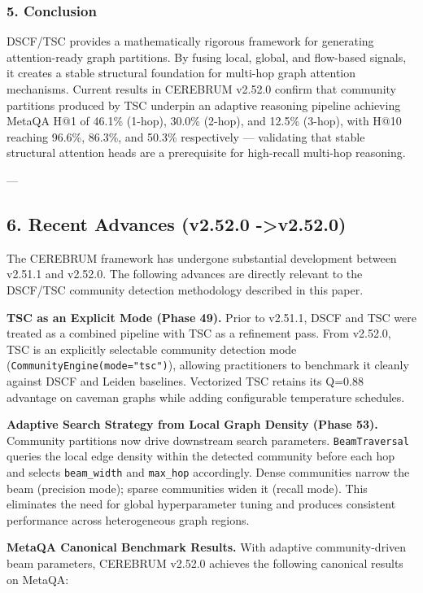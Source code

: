 \subsubsection{5. Conclusion}
DSCF/TSC provides a mathe\-matically rigorous framework for generating attention-ready graph partitions. By fusing local, global, and flow-based signals, it creates a stable structural foundation for multi-hop graph attention mechanisms. Current results in CEREBRUM v2.52.0 confirm that community partitions produced by TSC underpin an adaptive reasoning pipeline achieving MetaQA H@1 of 46.1\% (1-hop), 30.0\% (2-hop), and 12.5\% (3-hop), with H@10 reaching 96.6\%, 86.3\%, and 50.3\% respe\-ctively — validating that stable structural attention heads are a prere\-quisite for high-recall multi-hop reasoning.

---

\subsection{6. Recent Advances (v2.52.0 -\textgreater  v2.52.0)}

The CEREBRUM framework has undergone substantial development between v2.51.1 and v2.52.0. The following advances are directly relevant to the DSCF/TSC community detection methodology described in this paper.

\textbf{TSC as an Explicit Mode (Phase 49).} Prior to v2.51.1, DSCF and TSC were treated as a combined pipeline with TSC as a refinement pass. From v2.52.0, TSC is an explicitly selectable community detection mode (\texttt{CommunityEngine(mode="tsc")}), allowing pract\-itioners to benchmark it cleanly against DSCF and Leiden baselines. Vectorized TSC retains its Q=0.88 advantage on caveman graphs while adding confi\-gurable temperature schedules.

\textbf{Adaptive Search Strategy from Local Graph Density (Phase 53).} Community partitions now drive downstream search parameters. \texttt{BeamTraversal} queries the local edge density within the detected community before each hop and selects \texttt{beam\_width} and \texttt{max\_hop} accordingly. Dense communities narrow the beam (precision mode); sparse communities widen it (recall mode). This eliminates the need for global hyper\-parameter tuning and produces consistent performance across heter\-ogeneous graph regions.

\textbf{MetaQA Canonical Benchmark Results.} With adaptive community-driven beam parameters, CEREBRUM v2.52.0 achieves the following canonical results on MetaQA:

